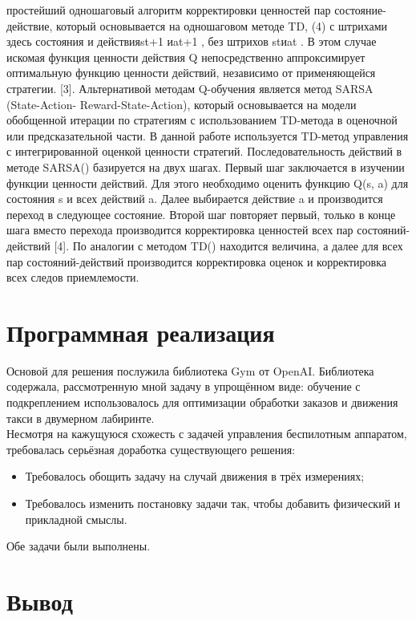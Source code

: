 \documentclass[12pt, a4paper]{report}
\theoremstyle{definition}
\theoremstyle{plain}
\theoremstyle{remark}
\theoremstyle{remark}
\theoremstyle{definition}
\begin{document}
простейший одношаговый алгоритм корректировки ценностей пар состояние- действие, который основывается на одношаговом методе TD, (4) с штрихами здесь состояния и действияst+1 иat+1 , без штрихов stиat . В этом случае искомая функция ценности действия Q непосредственно аппроксимирует оптимальную функцию ценности действий, независимо от применяющейся стратегии. [3].
Альтернативой методам Q-обучения является метод SARSA (State-Action- Reward-State-Action), который основывается на модели обобщенной итерации по стратегиям с использованием TD-метода в оценочной или предсказательной
части. В данной работе используется TD-метод управления с интегрированной оценкой ценности стратегий. Последовательность действий в методе SARSA() базируется на двух шагах. Первый шаг заключается в изучении функции ценности действий. Для этого необходимо оценить функцию Q(s, a) для состояния s и всех действий a. Далее выбирается действие a и производится переход в следующее состояние. Второй шаг повторяет первый, только в конце
шага вместо перехода производится корректировка ценностей всех пар состояний-действий [4]. По аналогии с методом TD() находится величина, а далее для всех пар состояний-действий производится корректировка оценок и корректировка всех следов приемлемости.

\section{Программная реализация}

Основой для решения послужила библиотека Gym от OpenAI. Библиотека содержала, рассмотренную мной задачу в упрощённом виде: обучение с подкреплением использовалось для оптимизации обработки заказов и движения такси в двумерном лабиринте.\\
Несмотря на кажущуюся схожесть с задачей управления беспилотным аппаратом, требовалась серьёзная доработка существующего решения:
\begin{itemize}
\item Требовалось обощить задачу на случай движения в трёх измерениях;
\item Требовалось изменить постановку задачи так, чтобы добавить физический и прикладной смыслы.
 \end{itemize}

Обе задачи были выполнены. 

\section{Вывод}
\end{document}
